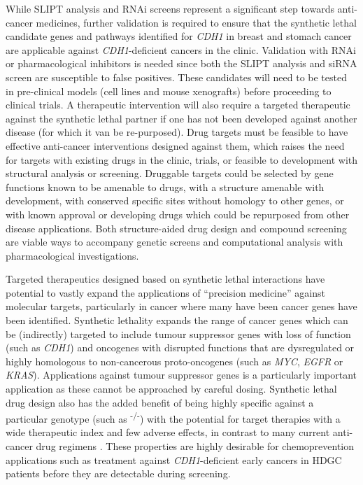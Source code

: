While \gls{SLIPT} analysis and \gls{RNAi} screens represent a significant step towards anti-cancer medicines, further validation is required to ensure that the synthetic lethal candidate genes and pathways identified for \textit{CDH1} in breast and stomach cancer are applicable against \textit{CDH1}-deficient cancers in the clinic.  Validation with \gls{RNAi} or pharmacological inhibitors is needed since both the \gls{SLIPT} analysis and \gls{siRNA} screen are susceptible to false positives. These candidates will need to be tested in pre-clinical models (cell lines and mouse xenografts) before proceeding to clinical trials. A therapeutic intervention will also require a targeted therapeutic against the synthetic lethal partner if one has not been developed against another disease (for which it van be re-purposed). Drug targets must be feasible to have effective anti-cancer interventions designed against them, which raises the need for targets with existing drugs in the clinic, trials, or feasible to development with structural analysis or screening.  Druggable targets could be selected by gene functions known to be amenable to drugs, with a structure amenable with development, with conserved specific sites without homology to other genes, or with known approval or developing drugs which could be repurposed from other disease applications. Both structure-aided drug design and compound screening are viable ways to accompany genetic screens and computational analysis with pharmacological investigations.

Targeted therapeutics designed based on synthetic lethal interactions have potential to vastly expand the applications of ``precision medicine'' against molecular targets, particularly in cancer where many have been cancer genes have been identified. Synthetic lethality expands the range of cancer genes which can be (indirectly) targeted to include tumour suppressor genes with loss of function (such as \textit{CDH1}) and oncogenes with disrupted functions that are dysregulated or highly homologous to non-cancerous proto-oncogenes (such as \textit{MYC}, \textit{EGFR} or \textit{KRAS}). Applications against tumour suppressor genes is a particularly important application as these cannot be approached by careful dosing. Synthetic lethal drug design also has the added benefit of being highly specific against a particular genotype (such as \textsuperscript{-/-}) with the potential for target therapies with a wide therapeutic index and few adverse effects, in contrast to many current anti-cancer drug regimens \citep{Hopkins2008, Kaelin2009}. These properties are highly desirable for chemoprevention applications such as treatment against \textit{CDH1}-deficient early cancers in \gls{HDGC} patients \citep{Guilford2010} before they are detectable during screening.

